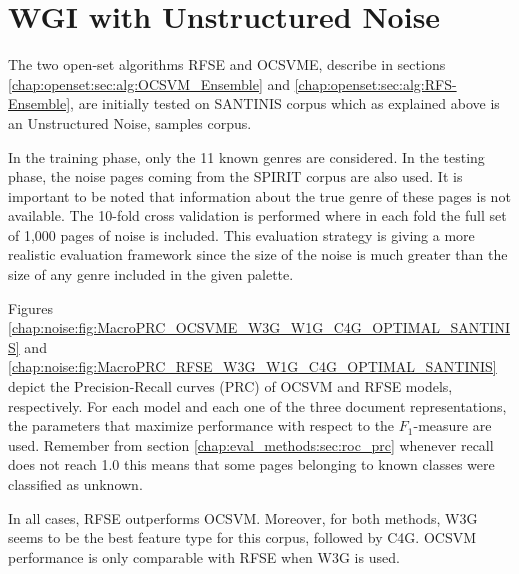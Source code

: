 \section{WGI with Unstructured Noise}\label{chap:noise:sec:WGI_noise}

The two open-set algorithms RFSE and OCSVME, describe in sections \ref{chap:openset:sec:alg:OCSVM_Ensemble} and \ref{chap:openset:sec:alg:RFS-Ensemble}, are initially tested on SANTINIS corpus which as explained above is an Unstructured Noise, samples corpus.   

In the training phase, only the 11 known genres are considered. In the testing phase, the noise pages coming from the SPIRIT corpus are also used. It is important to be noted that information about the true genre of these pages is not available. The 10-fold cross validation is performed where in each fold the full set of 1,000 pages of noise is included. This evaluation strategy is giving a more realistic evaluation framework since the size of the noise is much greater than the size of any genre included in the given palette.

Figures \ref{chap:noise:fig:MacroPRC_OCSVME_W3G_W1G_C4G_OPTIMAL_SANTINIS} and \ref{chap:noise:fig:MacroPRC_RFSE_W3G_W1G_C4G_OPTIMAL_SANTINIS} depict the Precision-Recall curves (PRC) of OCSVM and RFSE models, respectively. For each model and each one of the three document representations, the parameters that maximize performance with respect to the $F_{1}$-measure are used. Remember from section \ref{chap:eval_methods:sec:roc_prc} whenever recall does not reach 1.0 this means that some pages belonging to known classes were classified as unknown. 

In all cases, RFSE outperforms OCSVM. Moreover, for both methods, W3G seems to be the best feature type for this corpus, followed by C4G. OCSVM performance is only comparable with RFSE when W3G is used.

\hfill \break


